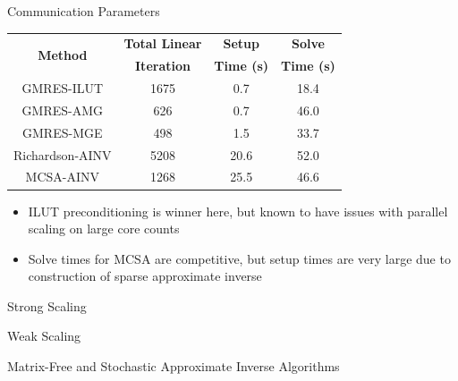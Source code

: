 \documentclass{beamer}
\begin{document}
\begin{frame}{Communication Parameters}
\begin{table}
\centering
\begin{tabular}{cccc}
\toprule
\multirow{2}{*}{\bfseries Method} &
\bfseries Total Linear & \bfseries Setup & \bfseries Solve \\
& \bfseries Iteration & \bfseries Time (s) & \bfseries Time (s) \\
\midrule
GMRES-ILUT      & 1675 & 0.7  & 18.4 \\
GMRES-AMG       & 626  & 0.7  & 46.0 \\
GMRES-MGE       & 498  & 1.5  & 33.7 \\
Richardson-AINV & 5208 & 20.6 & 52.0 \\
MCSA-AINV       & 1268 & 25.5 & 46.6 \\
\bottomrule
\end{tabular}
\end{table}
\begin{itemize}
  \item ILUT preconditioning is winner here, but known to have issues
    with parallel scaling on large core counts
  \item Solve times for MCSA are competitive, but setup times are very large
    due to construction of sparse approximate inverse
\end{itemize}
\end{frame}

\begin{frame}{Strong Scaling}

  
\end{frame}

\begin{frame}{Weak Scaling}

  
\end{frame}

\begin{frame}

  \center Matrix-Free and Stochastic Approximate Inverse Algorithms
  
\end{frame}
\end{document}
